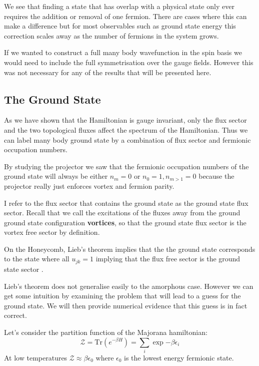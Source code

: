 We see that finding a state that has overlap with a physical state only ever requires the addition or removal of one fermion. There are cases where this can make a difference but for most observables such as ground state energy this correction scales away as the number of fermions in the system grows.

If we wanted to construct a full many body wavefunction in the spin basis we would need to include the full symmetrisation over the gauge fields. However this was not necessary for any of the results that will be presented here.

\hypertarget{the-ground-state}{%
\subsection{The Ground State}\label{the-ground-state}}

As we have shown that the Hamiltonian is gauge invariant, only the flux sector and the two topological fluxes affect the spectrum of the Hamiltonian. Thus we can label many body ground state by a combination of flux sector and fermionic occupation numbers.

By studying the projector we saw that the fermionic occupation numbers of the ground state will always be either \(n_m = 0\) or \(n_0 = 1, n_{m>1} = 0\) because the projector really just enforces vortex and fermion parity.

I refer to the flux sector that contains the ground state as the ground state flux sector. Recall that we call the excitations of the fluxes away from the ground ground state configuration \textbf{vortices}, so that the ground state flux sector is the vortex free sector by definition.

On the Honeycomb, Lieb's theorem implies that the the ground state corresponds to the state where all \(u_{jk} = 1\) implying that the flux free sector is the ground state sector \textcite{lieb_flux_1994}.

Lieb's theorem does not generalise easily to the amorphous case. However we can get some intuition by examining the problem that will lead to a guess for the ground state. We will then provide numerical evidence that this guess is in fact correct.

Let's consider the partition function of the Majorana hamiltonian: \[ \mathcal{Z} = \mathrm{Tr}\left( e^{-\beta H}\right) = \sum_i \exp{-\beta \epsilon_i}\] At low temperatures \(\mathcal{Z} \approx \beta \epsilon_0\) where \(\epsilon_0\) is the lowest energy fermionic state.

